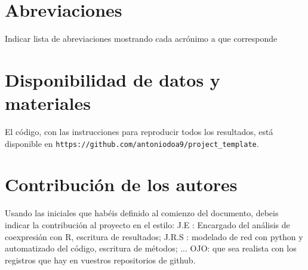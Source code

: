 \documentclass{bmcart}
\begin{document}
	\begin{backmatter}
	
		\section*{Abreviaciones}%
			Indicar lista de abreviaciones mostrando cada acrónimo a que corresponde
		
		\section*{Disponibilidad de datos y materiales}%
			El código, con las instrucciones para reproducir todos los resultados, está disponible en \texttt{https://github.com/antoniodoa9/project\_template}.
		
		\section*{Contribución de los autores}
			Usando las iniciales que habéis definido al comienzo del documento, debeis indicar la contribución al proyecto en el estilo:
			J.E : Encargado del análisis de coexpresión con R, escritura de resultados; J.R.S : modelado de red con python y automatizado del código, escritura de métodos; ...
			OJO: que sea realista con los registros que hay en vuestros repositorios de github. 
		
		
		
	
	\end{backmatter}
	
	
	
\end{document}
